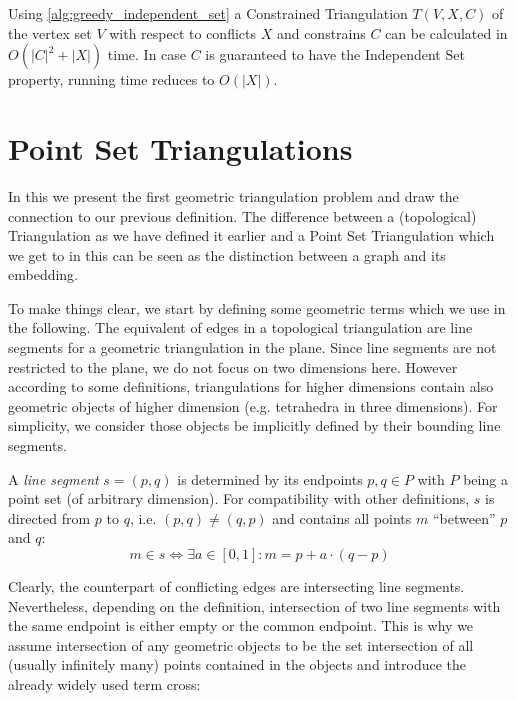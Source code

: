 \begin{theorem}
  Using \cref{alg:greedy_independent_set}
  a Constrained Triangulation \(T(V,X,C)\) of the vertex set \(V\)
  with respect to conflicts \(X\) and constrains \(C\)
  can be calculated in \(O(|C|^2 + |X|)\) time.
  In case \(C\) is guaranteed to have the Independent Set property,
  running time reduces to \(O(|X|)\).
\end{theorem}

\section{Point Set Triangulations}
\label{sec:point_set_triangulations}
In this  we present the first
geometric triangulation problem and draw the connection to our
previous definition. The difference between a (topological)
Triangulation as we have defined it earlier and a Point Set
Triangulation which we get to in this
 can be seen as the distinction
between a graph and its embedding.

To make things clear, we start by defining some geometric terms which
we use in the following. The equivalent of edges in a topological
triangulation are line segments for a geometric triangulation in the
plane. Since line segments are not restricted to the plane, we do not
focus on two dimensions here. However according to some definitions,
triangulations for higher dimensions contain also geometric objects
of higher dimension (e.g. tetrahedra in three dimensions). For
simplicity, we consider those objects be implicitly defined by their
bounding line segments.

\begin{definition}
  A \emph{line segment} \(s=(p,q)\) is determined by its endpoints
  \(p,q\in P\) with \(P\) being a point set (of arbitrary dimension). 
  For compatibility with other definitions,
  \(s\) is directed from \(p\) to \(q\), i.e. \((p,q)\not=(q,p)\)
  and contains all points \(m\) ``between'' \(p\) and \(q\):
  \[ m \in s \iff \exists a\in [0,1] : m = p + a \cdot (q-p) \]
\end{definition}

Clearly, the counterpart of conflicting edges are intersecting line
segments. Nevertheless, depending on the definition, intersection of
two line segments with the same endpoint is either empty or the common endpoint.
This is why we assume intersection of any geometric objects to be the
set intersection of all (usually infinitely many) points contained in
the objects and introduce the already widely used term \gls{cross}:

